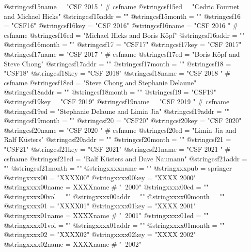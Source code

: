 @string{csf15name =             "CSF 2015 " # csfname}
@string{csf15ed =               "Cedric Fournet and Michael Hicks"}
@string{csf15addr =             ""}
@string{csf15month =            ""}
@string{csf16 =                 "CSF16"}
@string{csf16key =              "CSF 2016"}
@string{csf16name =             "CSF 2016 " # csfname}
@string{csf16ed =               "Michael Hicks and Boris Köpf"}
@string{csf16addr =             ""}
@string{csf16month =            ""}
@string{csf17 =                 "CSF17"}
@string{csf17key =              "CSF 2017"}
@string{csf17name =             "CSF 2017 " # csfname}
@string{csf17ed =               "Boris Köpf and Steve Chong"}
@string{csf17addr =             ""}
@string{csf17month =            ""}
@string{csf18 =                 "CSF18"}
@string{csf18key =              "CSF 2018"}
@string{csf18name =             "CSF 2018 " # csfname}
@string{csf18ed =               "Steve Chong and Stephanie Delaune"}
@string{csf18addr =             ""}
@string{csf18month =            ""}
@string{csf19 =                 "CSF19"}
@string{csf19key =              "CSF 2019"}
@string{csf19name =             "CSF 2019 " # csfname}
@string{csf19ed =               "Stephanie Delaune and Limin Jia"}
@string{csf19addr =             ""}
@string{csf19month =            ""}
@string{csf20 =                 "CSF20"}
@string{csf20key =              "CSF 2020"}
@string{csf20name =             "CSF 2020 " # csfname}
@string{csf20ed =               "Limin Jia and Ralf K{\"u}sters"}
@string{csf20addr =             ""}
@string{csf20month =            ""}
@string{csf21 =                 "CSF21"}
@string{csf21key =              "CSF 2021"}
@string{csf21name =             "CSF 2021 " # csfname}
@string{csf21ed =               "Ralf K{\"u}sters and Dave Naumann"}
@string{csf21addr =             ""}
@string{csf21month =            ""}
@string{xxxxname =              ""}
@string{xxxpub =                springer}
@string{xxxx00 =                "XXXX00"}
@string{xxxx00key =             "XXXX 2000"}
@string{xxxx00name =            XXXXname # "~2000"}
@string{xxxx00ed =              ""}
@string{xxxx00vol =             ""}
@string{xxxx00addr =            ""}
@string{xxxx00month =           ""}
@string{xxxx01 =                "XXXX01"}
@string{xxxx01key =             "XXXX 2001"}
@string{xxxx01name =            XXXXname # "~2001"}
@string{xxxx01ed =              ""}
@string{xxxx01vol =             ""}
@string{xxxx01addr =            ""}
@string{xxxx01month =           ""}
@string{xxxx02 =                "XXXX02"}
@string{xxxx02key =             "XXXX 2002"}
@string{xxxx02name =            XXXXname # "~2002"}
